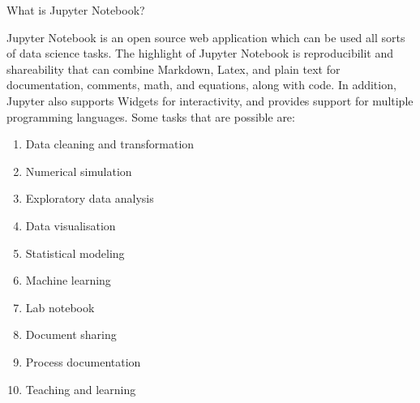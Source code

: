\documentclass[aspectratio=169,xcolor=dvipsnames,svgnames,x11names,fleqn]{beamer}
\begin{document}
\begin{frame}[containsverbatim]{What is Jupyter Notebook?}
    
    \footnotesize

    Jupyter Notebook is an open source web application which can be used all sorts of data science tasks. The highlight of Jupyter Notebook is reproducibilit and shareability that can combine Markdown, Latex, and plain text for documentation, comments, math, and equations, along with code. In addition, Jupyter also supports Widgets for interactivity, and provides support for multiple programming languages. Some tasks that are possible are:

    \begin{enumerate}
        \item Data cleaning and transformation
        \item Numerical simulation
        \item Exploratory data analysis
        \item Data visualisation
        \item Statistical modeling
        \item Machine learning
        \item Lab notebook
        \item Document sharing
        \item Process documentation
        \item Teaching and learning
    \end{enumerate}

\end{frame}
\end{document}
